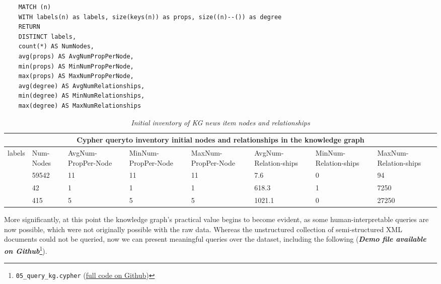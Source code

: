 \documentclass[11pt]{article}
\begin{document}

  \begin{table}
    \begin{lstlisting}
    MATCH (n)
    WITH labels(n) as labels, size(keys(n)) as props, size((n)--()) as degree
    RETURN
    DISTINCT labels,
    count(*) AS NumNodes,
    avg(props) AS AvgNumPropPerNode,
    min(props) AS MinNumPropPerNode,
    max(props) AS MaxNumPropPerNode,
    avg(degree) AS AvgNumRelationships,
    min(degree) AS MinNumRelationships,
    max(degree) AS MaxNumRelationships
    \end{lstlisting}
    \begin{tabular}{ |p{2cm}|p{1cm}|p{1.5cm}|p{1.5cm}|p{1.5cm}|p{1.5cm}|p{1.5cm}|p{1.5cm}| }
    \hline
    \multicolumn{8}{|c|}{Cypher query\protect \footnotemark to inventory initial nodes and relationships in the knowledge graph} \\
    \hline
    labels&Num-Nodes&AvgNum-PropPer-Node&MinNum-PropPer-Node&MaxNum-PropPer-Node&AvgNum-Relation-ships&MinNum-Relation-ships&MaxNum-Relation-ships\\
    \hline
    [``NewsItem'']&59542&11&11&11&7.6&0&94\\
    \hline
    [``Genre'']&42&1&1&1&618.3&1&7250\\
    \hline
    [``Subject'']&415&5&5&5&1021.1&0&27250\\
    \hline
    \end{tabular}
    \caption{\textit{Initial inventory of KG news item nodes and relationships}}
  \end{table}

  
  More significantly, at this point the knowledge graph's practical value begins to become evident, as some human-interpretable queries are now possible, which were not originally possible with the raw data. Whereas the unstructured collection of semi-structured XML documents could not be queried, now we can present meaningful queries over the dataset, including the following (\textit{\textbf{Demo file available on Github}}\footnote{\lstinline{05_query_kg.cypher} (\href{https://github.com/Birkbeck/msc-data-science-project-2020_21---files-heychrisek/}{full code on Github})}).
\end{document}
